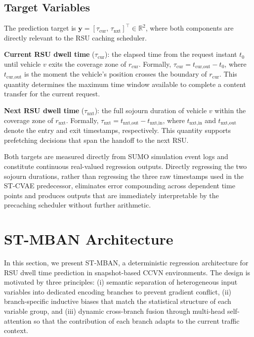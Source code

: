 \documentclass[journal]{IEEEtran}
\begin{document}
\subsection{Target Variables}
\label{sec.net.E}

The prediction target is $\mathbf{y} = [\tau_{\text{cur}},\, \tau_{\text{nxt}}]^\top
\in \mathbb{R}^2$, where both components are directly relevant to the RSU caching
scheduler.

\textbf{Current RSU dwell time} ($\tau_{\text{cur}}$): the elapsed time from the
request instant $t_0$ until vehicle $v$ exits the coverage zone of $r_{\text{cur}}$.
Formally, $\tau_{\text{cur}} = t_{\text{cur,out}} - t_0$, where $t_{\text{cur,out}}$
is the moment the vehicle's position crosses the boundary of $r_{\text{cur}}$.
This quantity determines the maximum time window available to complete a content
transfer for the current request.

\textbf{Next RSU dwell time} ($\tau_{\text{nxt}}$): the full sojourn duration of
vehicle $v$ within the coverage zone of $r_{\text{nxt}}$.
Formally, $\tau_{\text{nxt}} = t_{\text{nxt,out}} - t_{\text{nxt,in}}$, where
$t_{\text{nxt,in}}$ and $t_{\text{nxt,out}}$ denote the entry and exit timestamps,
respectively.
This quantity supports prefetching decisions that span the handoff to the next RSU.

Both targets are measured directly from SUMO simulation event logs and constitute
continuous real-valued regression outputs.
Directly regressing the two sojourn durations, rather than regressing the three
raw timestamps used in the ST-CVAE predecessor, eliminates error compounding across
dependent time points and produces outputs that are immediately interpretable by the
precaching scheduler without further arithmetic.

\section{ST-MBAN Architecture}\label{sec:architecture}

In this section, we present ST-MBAN, a deterministic regression architecture for RSU dwell time prediction in snapshot-based CCVN environments.
The design is motivated by three principles: (i) semantic separation of heterogeneous input variables into dedicated encoding branches to prevent gradient conflict, (ii) branch-specific inductive biases that match the statistical structure of each variable group, and (iii) dynamic cross-branch fusion through multi-head self-attention so that the contribution of each branch adapts to the current traffic context.
\end{document}
